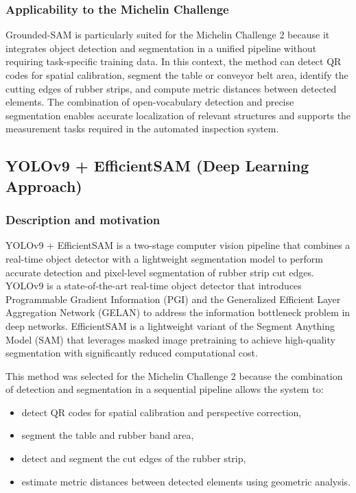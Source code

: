 \documentclass[11pt]{article}
\begin{document}
\subsubsection{Applicability to the Michelin Challenge}

Grounded-SAM is particularly suited for the Michelin Challenge 2 because it integrates 
object detection and segmentation in a unified pipeline without requiring task-specific 
training data. In this context, the method can detect QR codes for spatial calibration, 
segment the table or conveyor belt area, identify the cutting edges of rubber strips, and 
compute metric distances between detected elements. The combination of open-vocabulary 
detection and precise segmentation enables accurate localization of relevant structures 
and supports the measurement tasks required in the automated inspection system.

\subsection{YOLOv9 + EfficientSAM (Deep Learning Approach)}

\subsubsection{Description and motivation}

YOLOv9 + EfficientSAM is a two-stage computer vision pipeline that combines a 
real-time object detector with a lightweight segmentation model to perform accurate 
detection and pixel-level segmentation of rubber strip cut edges. YOLOv9 
\cite{WangYOLOv92024} is a state-of-the-art real-time object detector that introduces 
Programmable Gradient Information (PGI) and the Generalized Efficient Layer Aggregation 
Network (GELAN) to address the information bottleneck problem in deep networks. 
EfficientSAM \cite{XiongEfficientSAM2023} is a lightweight variant of the Segment 
Anything Model (SAM) that leverages masked image pretraining to achieve high-quality 
segmentation with significantly reduced computational cost.

This method was selected for the Michelin Challenge 2 because the combination of 
detection and segmentation in a sequential pipeline allows the system to:
\begin{itemize}
    \item detect QR codes for spatial calibration and perspective correction,
    \item segment the table and rubber band area,
    \item detect and segment the cut edges of the rubber strip,
    \item estimate metric distances between detected elements using geometric analysis.
\end{itemize}
\end{document}
